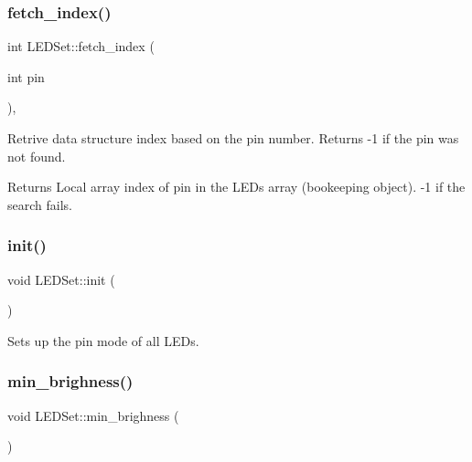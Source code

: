 \subsubsection{\texorpdfstring{fetch\+\_\+index()}{fetch\_index()}}
{\footnotesize\ttfamily int L\+E\+D\+Set\+::fetch\+\_\+index (\begin{DoxyParamCaption}\item[{int}]{pin }\end{DoxyParamCaption})\hspace{0.3cm}{\ttfamily [inline]}, {\ttfamily [private]}}



Retrive data structure index based on the pin number. Returns -\/1 if the pin was not found. 

\begin{DoxyReturn}{Returns}
Local array index of pin in the L\+E\+Ds array (bookeeping object). -\/1 if the search fails. 
\end{DoxyReturn}
\mbox{\label{classLEDSet_a907747547c2967c4db9597247c0acd9c}} 
\subsubsection{\texorpdfstring{init()}{init()}}
{\footnotesize\ttfamily void L\+E\+D\+Set\+::init (\begin{DoxyParamCaption}{ }\end{DoxyParamCaption})\hspace{0.3cm}{\ttfamily [inline]}}



Sets up the pin mode of all L\+E\+Ds. 

\mbox{\label{classLEDSet_ab0b5216d009c92273505d4f055f4676f}} 
\subsubsection{\texorpdfstring{min\+\_\+brighness()}{min\_brighness()}}
{\footnotesize\ttfamily void L\+E\+D\+Set\+::min\+\_\+brighness (\begin{DoxyParamCaption}{ }\end{DoxyParamCaption})\hspace{0.3cm}{\ttfamily [inline]}}



